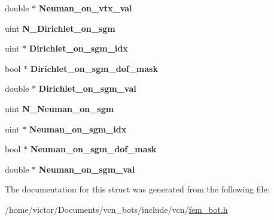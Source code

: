 \begin{DoxyCompactItemize}
\item 
\hypertarget{structvcn__bcond__t_adb7370485e6c98af0c42892016434611}{double $\ast$ {\bfseries Neuman\+\_\+on\+\_\+vtx\+\_\+val}}\label{structvcn__bcond__t_adb7370485e6c98af0c42892016434611}

\item 
\hypertarget{structvcn__bcond__t_afe05cdcf96ef0924a3999e7c85146d78}{uint {\bfseries N\+\_\+\+Dirichlet\+\_\+on\+\_\+sgm}}\label{structvcn__bcond__t_afe05cdcf96ef0924a3999e7c85146d78}

\item 
\hypertarget{structvcn__bcond__t_afbd490b052718c982b1cf415eb25b95d}{uint $\ast$ {\bfseries Dirichlet\+\_\+on\+\_\+sgm\+\_\+idx}}\label{structvcn__bcond__t_afbd490b052718c982b1cf415eb25b95d}

\item 
\hypertarget{structvcn__bcond__t_aaec39f6edb408dea2cf28ea1bd2cb036}{bool $\ast$ {\bfseries Dirichlet\+\_\+on\+\_\+sgm\+\_\+dof\+\_\+mask}}\label{structvcn__bcond__t_aaec39f6edb408dea2cf28ea1bd2cb036}

\item 
\hypertarget{structvcn__bcond__t_a1e74f653b9e6f8600c6567f41313c238}{double $\ast$ {\bfseries Dirichlet\+\_\+on\+\_\+sgm\+\_\+val}}\label{structvcn__bcond__t_a1e74f653b9e6f8600c6567f41313c238}

\item 
\hypertarget{structvcn__bcond__t_a8a95a409374133dadad54ca65967e6da}{uint {\bfseries N\+\_\+\+Neuman\+\_\+on\+\_\+sgm}}\label{structvcn__bcond__t_a8a95a409374133dadad54ca65967e6da}

\item 
\hypertarget{structvcn__bcond__t_a9e2777304ddc422ffc031423269c77b0}{uint $\ast$ {\bfseries Neuman\+\_\+on\+\_\+sgm\+\_\+idx}}\label{structvcn__bcond__t_a9e2777304ddc422ffc031423269c77b0}

\item 
\hypertarget{structvcn__bcond__t_a4dbb92759cffd3ce0ef9a63442e70de7}{bool $\ast$ {\bfseries Neuman\+\_\+on\+\_\+sgm\+\_\+dof\+\_\+mask}}\label{structvcn__bcond__t_a4dbb92759cffd3ce0ef9a63442e70de7}

\item 
\hypertarget{structvcn__bcond__t_a6071af4b87cb5852d9d77772cb61240a}{double $\ast$ {\bfseries Neuman\+\_\+on\+\_\+sgm\+\_\+val}}\label{structvcn__bcond__t_a6071af4b87cb5852d9d77772cb61240a}

\end{DoxyCompactItemize}


The documentation for this struct was generated from the following file\+:\begin{DoxyCompactItemize}
\item 
/home/victor/\+Documents/vcn\+\_\+bots/include/vcn/\hyperlink{fem__bot_8h}{fem\+\_\+bot.\+h}\end{DoxyCompactItemize}
